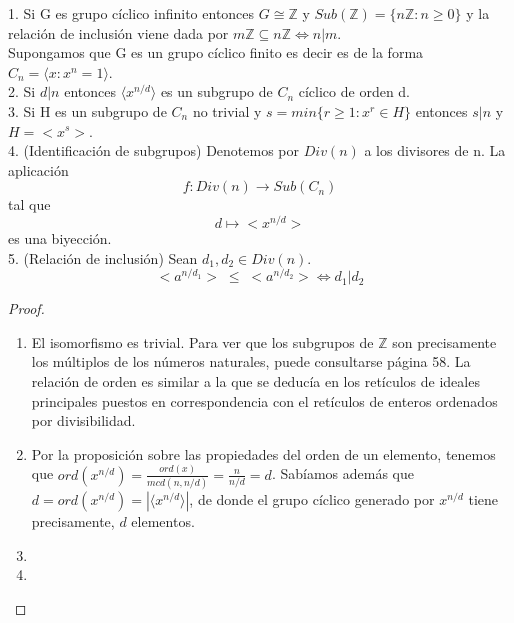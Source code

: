 \begin{theorem}
1. Si G es grupo cíclico infinito entonces $G \cong \mathbb{Z}$ y $Sub(\mathbb{Z}) = \{n\mathbb{Z}:n \ge 0\}$ y la relación de inclusión viene dada por $m\mathbb{Z} \subseteq n\mathbb{Z} \iff n|m$. \\
Supongamos que G es un grupo cíclico finito es decir es de la forma $C_n = \langle x:x^n = 1 \rangle$.\\
2. Si $d|n$ entonces $\langle x^{n/d} \rangle$ es un subgrupo de $C_n$ cíclico de orden d. \\
3. Si H es un subgrupo de $C_n$ no trivial y $s = min\{r \ge 1:x^r \in H\}$ entonces $s|n$ y $H = <x^s>$. \\
4. (Identificación de subgrupos) Denotemos por $Div(n)$ a los divisores de n. La aplicación $$f:Div(n) \rightarrow Sub(C_n)$$ tal que $$d \mapsto <x^{n/d}>$$ es una biyección.  \\
5. (Relación de inclusión) Sean $d_1,d_2 \in Div(n)$. $$<a^{n/d_1}> \; \le \; <a^{n/d_2}> \iff d_1|d_2$$ 
\end{theorem}
\begin{proof}
\begin{enumerate}
\item El isomorfismo es trivial. Para ver que los subgrupos de $\mathbb{Z}$ son precisamente los múltiplos de los números naturales, puede consultarse \cite{dorronsoro} página 58. La relación de orden es similar a la que se deducía en los retículos de ideales principales puestos en correspondencia con el retículos de enteros ordenados por divisibilidad. 
\item Por la proposición sobre las propiedades del orden de un elemento, tenemos que $ord(x^{n/d}) = \frac{ord(x)}{mcd(n,n/d)} = \frac{n}{n/d} = d$. Sabíamos además que $d = ord(x^{n/d}) = |\langle x^{n/d} \rangle|$, de donde el grupo cíclico generado por $x^{n/d}$ tiene precisamente, $d$ elementos. 
\item 
\item 
\end{enumerate}
\end{proof}